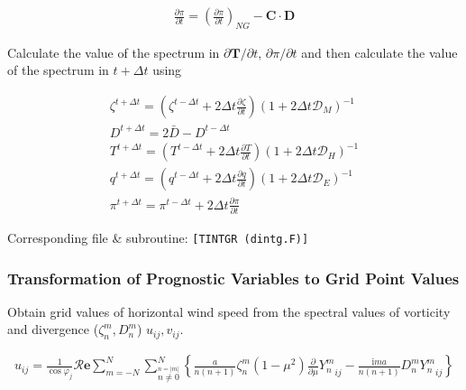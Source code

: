 \begin{eqnarray}
  \frac{\partial \pi}{\partial t}
      =   \left( \frac{\partial \pi}
                        {\partial t}       \right)_{NG}  
         - {\mathbf{C}} \cdot {\mathbf{D}}
\end{eqnarray}

Calculate the value of the spectrum in
\(\partial {\mathbf{T}}/\partial t\), \(\partial \pi/\partial t\) and
then calculate the value of the spectrum in \(t+\Delta t\) using

\begin{eqnarray}
  \zeta^{t+\Delta t}  =  \left( \zeta^{t-\Delta t}
                                +   2 \Delta t \frac{\partial{\zeta}}{\partial {t}} \right)
                          ( 1 + 2 \Delta t {\mathcal D}_M )^{-1} \\
  D^{t+\Delta t}  =  2 \bar{D} - D^{t-\Delta t}\\
  T^{t+\Delta t}  =  \left( T^{t-\Delta t}
                                +  2 \Delta t  \frac{\partial{T}}{\partial {t}} \right)
                          ( 1 + 2 \Delta t {\mathcal D}_H )^{-1} \\
  q^{t+\Delta t}  =  \left( q^{t-\Delta t}
                                +  2 \Delta t \frac{\partial{q}}{\partial {t}} \right)
                          ( 1 + 2 \Delta t {\mathcal D}_E )^{-1} \\
\pi^{t+\Delta t}  =  \pi^{t-\Delta t}
                                +  2 \Delta t \frac{\partial{\pi}}{\partial {t}}
\end{eqnarray}

Corresponding file \& subroutine: \texttt{{[}TINTGR\ (dintg.F){]}}

\hypertarget{transformation-of-prognostic-variables-to-grid-point-values}{%
\subsubsection{Transformation of Prognostic Variables to Grid Point
Values}\label{transformation-of-prognostic-variables-to-grid-point-values}}

Obtain grid values of horizontal wind speed from the spectral values of
vorticity and divergence (\(\zeta_n^m, D_n^m\)) \(u_{ij}, v_{ij}\).

\begin{eqnarray}
  u_{ij}
  =  \frac{1}{\cos \varphi_j}
     {\mathcal R}{\mathbf{e}} \sum_{m=-N}^{N}
                       \sum_{\stackrel{n=|m|}{n \neq 0}}^{N}
    \left\{
             \frac{a}{n(n+1)} \zeta_n^m
            (1-\mu^{2}) \frac{\partial{}}{\partial {\mu}} {Y_n^m}_{ij}
          -  \frac{\mathrm{i}m a}{n(n+1)} D_n^m {Y_n^m}_{ij}
    \right\}
\end{eqnarray}

